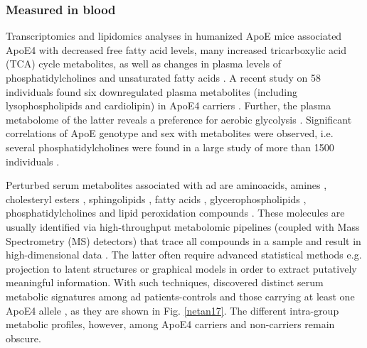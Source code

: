 \documentclass{amsart}
\begin{document}
\subsubsection{Measured in blood}
Transcriptomics and lipidomics analyses in humanized ApoE mice associated ApoE4 with decreased free fatty acid levels, many increased  tricarboxylic acid (TCA) cycle metabolites, as well as changes in plasma levels of phosphatidylcholines and unsaturated fatty acids \cite{Area-Gomez2020APOE4Mice, Zhao2020AlzheimersPathways}. A recent study on 58 individuals found six downregulated plasma metabolites (including lysophospholipids and cardiolipin) in ApoE4 carriers \cite{pena-bautista2020MetabolomicsEffect}. Further, the plasma metabolome of the latter reveals a preference for aerobic glycolysis \cite{Farmer2021APO4Glycolysis}. Significant correlations of ApoE genotype and sex with metabolites were observed, i.e. several phosphatidylcholines were found in a large study of more than 1500 individuals \cite{Arnold2020SexMetabolome}.

Perturbed serum metabolites associated with \acrshort{ad} are aminoacids, amines \cite{deLeeuw2017Blood-basedDisease, Green2023InvestigatingDisease}, cholesteryl esters \cite{Proitsi2017AssociationAnalysis}, sphingolipids \cite{Varma2018BrainStudy,Sun2022AssociationDisease,Green2023InvestigatingDisease,Oeckl2019GlialImpairment,Barupal2019SetsPathophysiology}, fatty acids \cite{Fernandez-Calle2022APOEDiseases,deLeeuw2017Blood-basedDisease}, glycerophospholipids \cite{Varma2018BrainStudy, Jia2022ATypes,Huo2020BrainAnalysis, Weng2019TheImpairment}, phosphatidylcholines \cite{Simpson2016BloodAging} and lipid peroxidation compounds \cite{Fernandez-Calle2022APOEDiseases}. These molecules are usually identified via high-throughput metabolomic pipelines (coupled with Mass Spectrometry (MS) detectors) that trace all compounds in a sample and result in high-dimensional data \cite{Oka2023MultiomicsCohort}. The latter often require advanced statistical methods e.g. projection to latent structures \cite{Weng2019TheImpairment, Peeters2019StableData} or graphical models \cite{Peeters2022Rags2ridges:Matrices} in order to extract putatively meaningful information. 
With such techniques, \citeauthor{deLeeuw2017Blood-basedDisease} discovered distinct serum metabolic signatures among \acrshort{ad} patients-controls and those carrying at least one ApoE4 allele \cite{deLeeuw2017Blood-basedDisease}, as they are shown in Fig. \ref{netan17}. The different intra-group metabolic profiles, however, among ApoE4 carriers and non-carriers remain obscure.
\end{document}
